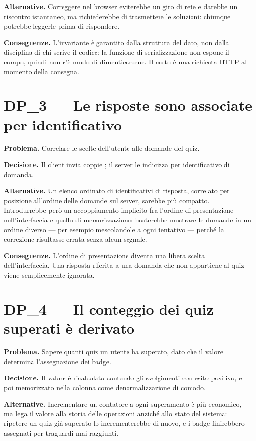 \textbf{Alternative.} Correggere nel browser eviterebbe un giro di rete e
darebbe un riscontro istantaneo, ma richiederebbe di trasmettere le
soluzioni: chiunque potrebbe leggerle prima di rispondere.

\textbf{Conseguenze.} L'invariante è garantito dalla struttura del dato, non
dalla disciplina di chi scrive il codice: la funzione di serializzazione non
espone il campo, quindi non c'è modo di dimenticarsene. Il costo è una
richiesta HTTP al momento della consegna.

\section{DP\_3 — Le risposte sono associate per identificativo}

\textbf{Problema.} Correlare le scelte dell'utente alle domande del quiz.

\textbf{Decisione.} Il client invia coppie
; il server le indicizza per identificativo di
domanda.

\textbf{Alternative.} Un elenco ordinato di identificativi di risposta,
correlato per posizione all'ordine delle domande sul server, sarebbe più
compatto. Introdurrebbe però un accoppiamento implicito fra l'ordine di
presentazione nell'interfaccia e quello di memorizzazione: basterebbe
mostrare le domande in un ordine diverso — per esempio mescolandole a ogni
tentativo — perché la correzione risultasse errata senza alcun segnale.

\textbf{Conseguenze.} L'ordine di presentazione diventa una libera scelta
dell'interfaccia. Una risposta riferita a una domanda che non appartiene al
quiz viene semplicemente ignorata.

\section{DP\_4 — Il conteggio dei quiz superati è derivato}

\textbf{Problema.} Sapere quanti quiz un utente ha superato, dato che il
valore determina l'assegnazione dei badge.

\textbf{Decisione.} Il valore è ricalcolato contando gli svolgimenti con
esito positivo, e poi memorizzato nella colonna 
come denormalizzazione di comodo.

\textbf{Alternative.} Incrementare un contatore a ogni superamento è più
economico, ma lega il valore alla storia delle operazioni anziché allo stato
del sistema: ripetere un quiz già superato lo incrementerebbe di nuovo, e i
badge finirebbero assegnati per traguardi mai raggiunti.

